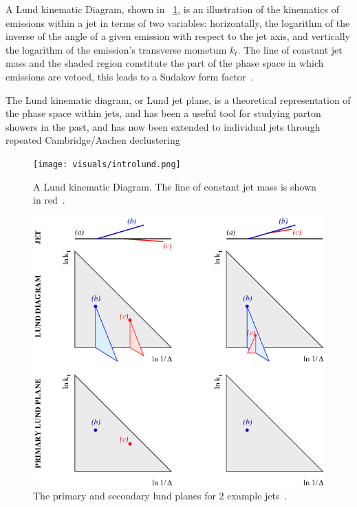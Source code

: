 A Lund kinematic Diagram, shown in  ~\ref{fig:introlund}, is an illustration of the kinematics of emissions within a jet in terms of two variables: horizontally, the logarithm of the inverse of the angle of a given emission with respect to the jet axis, and vertically the logarithm of the emission's transverse mometum $k_t$. The line of constant jet mass and the shaded region constitute the part of the phase space in which emissions are vetoed, this leads to a Sudakov form factor~\cite{mmdt}.

The Lund kinematic diagram, or Lund jet plane, is a theoretical representation of the phase space within jets, and has been a useful tool for studying parton showers in the past, and has now been extended to individual jets through repeated Cambridge/Aachen declustering ~\cite{Dreyer:2018nbf}



\begin{figure}[htb]
\centering
\texttt{[image: visuals/introlund.png]}
\caption{A Lund kinematic Diagram. The line of constant jet mass is shown in red~\cite{mmdt}.  }
\label{fig:introlund}
\end{figure}



\begin{figure}[htb]
\centering
\includegraphics[width=1.0\textwidth]{visuals/figs_lund.png}
\caption{The primary and secondary lund planes for 2 example jets~\cite{Dreyer:2018nbf}.}
\label{fig:lundPrimaryandSecondary}
\end{figure}


